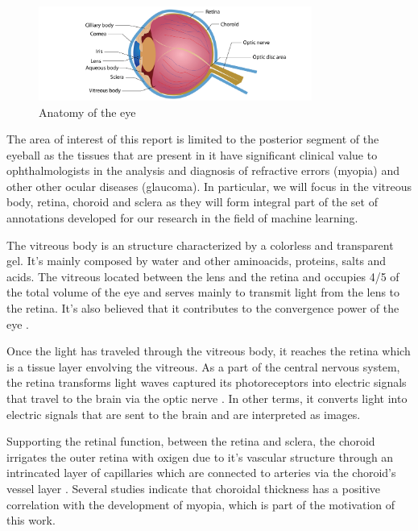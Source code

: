 \documentclass[12pt,a4paper]{scrartcl}
\begin{document}
\begin{figure}[H]
    \centering
    \includegraphics[width=0.8\textwidth]{./images/anatomy-of-the-eye.jpg}
    \caption{Anatomy of the eye \cite{eyeanatomy-pic}}
    \label{fig:eye-anatomy}
\end{figure}

The area of interest of this report is limited to the posterior segment of the eyeball as the tissues that are present in it have significant clinical value to ophthalmologists in the analysis and diagnosis of refractive errors (myopia) and other other ocular diseases (glaucoma)\cite{Ronchetti2017}. In particular, we will focus in the vitreous body, retina, choroid and sclera as they will form integral part of the set of annotations developed for our research in the field of machine learning. 

The vitreous body is an structure characterized by a colorless and transparent gel. It's mainly composed by water and other aminoacids, proteins, salts and acids. The vitreous located between the lens and the retina and occupies 4/5 of the total volume of the eye and serves mainly to transmit light from the lens to the retina. It's also believed that it contributes to the convergence power of the eye \cite{snell1998}. 

Once the light has traveled through the vitreous body, it reaches the retina which is a tissue layer envolving the vitreous. As a part of the central nervous system, the retina transforms light waves captured its photoreceptors into electric signals that travel to the brain via the optic nerve \cite{purves2001}. In other terms, it converts light into electric signals that are sent to the brain and are interpreted as images.

Supporting the retinal function, between the retina and sclera, the choroid irrigates the outer retina with oxigen due to it's vascular structure through an intrincated layer of capillaries which are connected to arteries via the choroid's vessel layer \cite{snell1998, choroidExpl}. Several studies \cite{Ronchetti2019, Ronchetti2018} indicate that choroidal thickness has a positive correlation with the development of myopia, which is part of the motivation of this work. 
\end{document}
